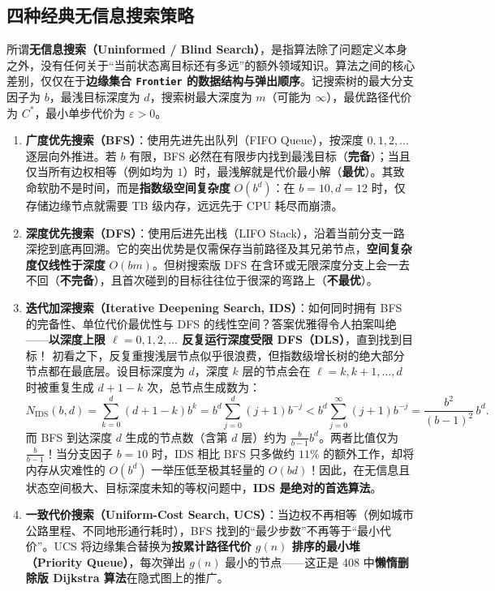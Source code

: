 \subsection{四种经典无信息搜索策略}

所谓\textbf{无信息搜索（Uninformed / Blind Search）}，是指算法除了问题定义本身之外，没有任何关于“当前状态离目标还有多远”的额外领域知识。算法之间的核心差别，仅仅在于\textbf{边缘集合 \texttt{Frontier} 的数据结构与弹出顺序}。记搜索树的最大分支因子为 $b$，最浅目标深度为 $d$，搜索树最大深度为 $m$（可能为 $\infty$），最优路径代价为 $C^*$，最小单步代价为 $\varepsilon > 0$。

\begin{enumerate}
  \item \textbf{广度优先搜索（BFS）}：使用先进先出队列（FIFO Queue），按深度 $0, 1, 2, \dots$ 逐层向外推进。若 $b$ 有限，BFS 必然在有限步内找到最浅目标（\textbf{完备}）；当且仅当所有边权相等（例如均为 $1$）时，最浅解就是代价最小解（\textbf{最优}）。其致命软肋不是时间，而是\textbf{指数级空间复杂度} $O(b^d)$：在 $b=10, d=12$ 时，仅存储边缘节点就需要 TB 级内存，远远先于 CPU 耗尽而崩溃。
  \item \textbf{深度优先搜索（DFS）}：使用后进先出栈（LIFO Stack），沿着当前分支一路深挖到底再回溯。它的突出优势是仅需保存当前路径及其兄弟节点，\textbf{空间复杂度仅线性于深度} $O(bm)$。但树搜索版 DFS 在含环或无限深度分支上会一去不回（\textbf{不完备}），且首次碰到的目标往往位于很深的弯路上（\textbf{不最优}）。
  \item \textbf{迭代加深搜索（Iterative Deepening Search, IDS）}：如何同时拥有 BFS 的完备性、单位代价最优性与 DFS 的线性空间？答案优雅得令人拍案叫绝——\textbf{以深度上限 $\ell = 0, 1, 2, \dots$ 反复运行深度受限 DFS（DLS）}，直到找到目标！
  初看之下，反复重搜浅层节点似乎很浪费，但指数级增长树的绝大部分节点都在最底层。设目标深度为 $d$，深度 $k$ 层的节点会在 $\ell = k, k+1, \dots, d$ 时被重复生成 $d+1-k$ 次，总节点生成数为：
  \begin{equation}\label{eq:ids-nodes}
    N_{\text{IDS}}(b, d) = \sum_{k=0}^{d} (d + 1 - k) b^k = b^d \sum_{j=0}^{d} (j+1) b^{-j} < b^d \sum_{j=0}^{\infty} (j+1) b^{-j} = \frac{b^2}{(b-1)^2}\, b^d.
  \end{equation}
  而 BFS 到达深度 $d$ 生成的节点数（含第 $d$ 层）约为 $\frac{b}{b-1} b^d$。两者比值仅为 $\frac{b}{b-1}$！当分支因子 $b=10$ 时，IDS 相比 BFS 只多做约 $11\%$ 的额外工作，却将内存从灾难性的 $O(b^d)$ 一举压低至极其轻量的 $O(bd)$！因此，在无信息且状态空间极大、目标深度未知的等权问题中，\textbf{IDS 是绝对的首选算法}。
  \item \textbf{一致代价搜索（Uniform-Cost Search, UCS）}：当边权不再相等（例如城市公路里程、不同地形通行耗时），BFS 找到的“最少步数”不再等于“最小代价”。UCS 将边缘集合替换为\textbf{按累计路径代价 $g(n)$ 排序的最小堆（Priority Queue）}，每次弹出 $g(n)$ 最小的节点——这正是 408 中\textbf{懒惰删除版 Dijkstra 算法}在隐式图上的推广。
\end{enumerate}


